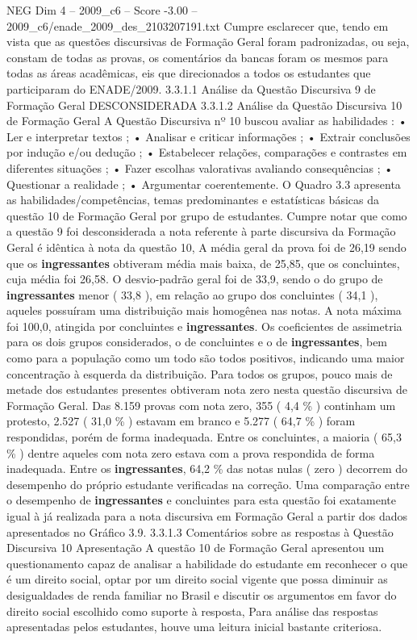 \begin{textsample}{NEG Dim 4 – 2009\_c6 – Score -3.00 – 2009\_c6/enade\_2009\_des\_2103207191.txt}
Cumpre esclarecer que, tendo em vista que as questões discursivas de Formação Geral foram padronizadas, ou seja, constam de todas as provas, os comentários da bancas foram os mesmos para todas as áreas acadêmicas, eis que direcionados a todos os estudantes que participaram do ENADE/2009. 3.3.1.1 Análise da Questão Discursiva 9 de Formação Geral DESCONSIDERADA 3.3.1.2 Análise da Questão Discursiva 10 de Formação Geral A Questão Discursiva nº 10 buscou avaliar as habilidades : • Ler e interpretar textos ; • Analisar e criticar informações ; • Extrair conclusões por indução e/ou dedução ; • Estabelecer relações, comparações e contrastes em diferentes situações ; • Fazer escolhas valorativas avaliando consequências ; • Questionar a realidade ; • Argumentar coerentemente.
O Quadro 3.3 apresenta as habilidades/competências, temas predominantes e estatísticas básicas da questão 10 de Formação Geral por grupo de estudantes.
Cumpre notar que como a questão 9 foi desconsiderada a nota referente à parte discursiva da Formação Geral é idêntica à nota da questão 10, A média geral da prova foi de 26,19 sendo que os \textbf{ingressantes} obtiveram média mais baixa, de 25,85, que os concluintes, cuja média foi 26,58.
O desvio-padrão geral foi de 33,9, sendo o do grupo de \textbf{ingressantes} menor ( 33,8 ), em relação ao grupo dos concluintes ( 34,1 ), aqueles possuíram uma distribuição mais homogênea nas notas.
A nota máxima foi 100,0, atingida por concluintes e \textbf{ingressantes}.
Os coeficientes de assimetria para os dois grupos considerados, o de concluintes e o de \textbf{ingressantes}, bem como para a população como um todo são todos positivos, indicando uma maior concentração à esquerda da distribuição.
Para todos os grupos, pouco mais de metade dos estudantes presentes obtiveram nota zero nesta questão discursiva de Formação Geral.
Das 8.159 provas com nota zero, 355 ( 4,4 \% ) continham um protesto, 2.527 ( 31,0 \% ) estavam em branco e 5.277 ( 64,7 \% ) foram respondidas, porém de forma inadequada.
Entre os concluintes, a maioria ( 65,3 \% ) dentre aqueles com nota zero estava com a prova respondida de forma inadequada.
Entre os \textbf{ingressantes}, 64,2 \% das notas nulas ( zero ) decorrem do desempenho do próprio estudante verificadas na correção.
Uma comparação entre o desempenho de \textbf{ingressantes} e concluintes para esta questão foi exatamente igual à já realizada para a nota discursiva em Formação Geral a partir dos dados apresentados no Gráfico 3.9. 3.3.1.3 Comentários sobre as respostas à Questão Discursiva 10 Apresentação A questão 10 de Formação Geral apresentou um questionamento capaz de analisar a habilidade do estudante em reconhecer o que é um direito social, optar por um direito social vigente que possa diminuir as desigualdades de renda familiar no Brasil e discutir os argumentos em favor do direito social escolhido como suporte à resposta, Para análise das respostas apresentadas pelos estudantes, houve uma leitura inicial bastante criteriosa.

\end{textsample}
